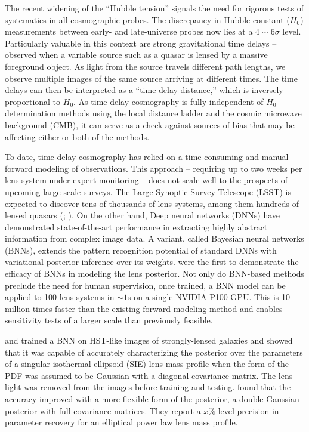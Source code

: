 The recent widening of the ``Hubble tension'' signals the need for rigorous tests of systematics in all cosmographic probes. The discrepancy in Hubble constant ($H_0$) measurements between early- and late-universe probes now lies at a $4 \sim 6\sigma$ level. Particularly valuable in this context are strong gravitational time delays -- observed when a variable source such as a quasar is lensed by a massive foreground object. As light from the source travels different path lengths, we observe multiple images of the same source arriving at different times. The time delays can then be interpreted as a ``time delay distance,'' which is inversely proportional to $H_0$. As time delay cosmography is fully independent of $H_0$ determination methods using the local distance ladder and the cosmic microwave background (CMB), it can serve as a check against sources of bias that may be affecting either or both of the methods.

To date, time delay cosmography has relied on a time-consuming and manual forward modeling of observations. This approach -- requiring up to two weeks per lens system under expert monitoring -- does not scale well to the prospects of upcoming large-scale surveys. The Large Synoptic Survey Telescope (LSST) is expected to discover tens of thousands of lens systems, among them hundreds of lensed quasars (\cite{collett2015population}; \cite{oguri2010gravitationally}). On the other hand, Deep neural networks (DNNs) have demonstrated state-of-the-art performance in extracting highly abstract information from complex image data. A variant, called Bayesian neural networks (BNNs), extends the pattern recognition potential of standard DNNs with variational posterior inference over its weights. \cite{hezaveh2017fast} were the first to demonstrate the efficacy of BNNs in modeling the lens posterior. Not only do BNN-based methods preclude the need for human supervision, once trained, a BNN model can be applied to 100 lens systems in $\sim 1$s on a single NVIDIA P100 GPU. This is 10 million times faster than the existing forward modeling method and enables sensitivity tests of a larger scale than previously feasible.

\cite{hezaveh2017fast} and \cite{levasseur2017uncertainties} trained a BNN on HST-like images of strongly-lensed galaxies and showed that it was capable of accurately characterizing the posterior over the parameters of a singular isothermal ellipsoid (SIE) lens mass profile when the form of the PDF was assumed to be Gaussian with a diagonal covariance matrix. The lens light was removed from the images before training and testing. \cite{wagnercarena2019double} found that the accuracy improved with a more flexible form of the posterior, a double Gaussian posterior with full covariance matrices. They report a $x \%$-level precision in parameter recovery for an elliptical power law lens mass profile.

